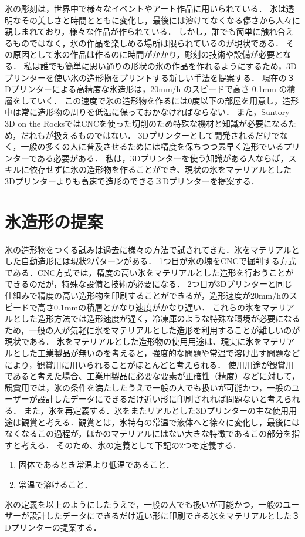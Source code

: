 氷の彫刻は，世界中で様々なイベントやアート作品に用いられている．
氷は透明なその美しさと時間とともに変化し，最後には溶けてなくなる儚さから人々に親しまれており，様々な作品が作られている．
しかし，誰でも簡単に触れ合えるものではなく，氷の作品を楽しめる場所は限られているのが現状である．
その原因として氷の作品は作るのに時間がかかり，彫刻の技術や設備が必要となる．
私は誰でも簡単に思い通りの形状の氷の作品を作れるようにするため，3Dプリンターを使い氷の造形物をプリントする新しい手法を提案する．
現在の３Dプリンターによる高精度な氷造形は，20mm/h のスピードで高さ 0.1mm の積層をしていく．
この速度で氷の造形物を作るには0度以下の部屋を用意し，造形中は常に造形物の周りを低温に保っておかなければならない．
また，Suntory-3D on the RocksではCNCを使った切削のため特殊な機材と知識が必要になるため，だれもが扱えるものではない．
3Dプリンターとして開発されるだけでなく，一般の多くの人に普及させるためには精度を保ちつつ素早く造形でいるプリンターである必要がある．
私は，3Dプリンターを使う知識がある人ならば，スキルに依存せずに氷の造形物を作ることができ、現状の氷をマテリアルとした3Dプリンターよりも高速で造形のできる３Dプリンターを提案する．

\section{氷造形の提案}
\label{sec:enum}

氷の造形物をつくる試みは過去に様々の方法で試されてきた．氷をマテリアルとした自動造形には現状2パターンがある．
1つ目が氷の塊をCNCで掘削する方式である．CNC方式では，精度の高い氷をマテリアルとした造形を行おうことができるのだが，特殊な設備と技術が必要になる．
2つ目が3Dプリンターと同じ仕組みで精度の高い造形物を印刷することができるが，造形速度が20mm/hのスピードで高さ0.1mmの積層とかなり速度がかなり遅い．
これらの氷をマテリアルとした造形方法では造形速度が遅く，冷凍庫のような特殊な環境が必要になるため，一般の人が気軽に氷をマテリアルとした造形を利用することが難しいのが現状である．
氷をマテリアルとした造形物の使用用途は、現実に氷をマテリアルとした工業製品が無いのを考えると，強度的な問題や常温で溶け出す問題などにより，観賞用に用いられることがほとんどと考えられる．
使用用途が観賞用であると考えた場合、工業用製品に必要な要素が正確性（精度）などに対して，観賞用では，氷の条件を満たしたうえで一般の人でも扱いが可能かつ，一般のユーザーが設計したデータにできるだけ近い形に印刷されれば問題ないと考えられる．
また，氷を再定義する．氷をまたリアルとした3Dプリンターの主な使用用途は観賞と考える．観賞とは，氷特有の常温で液体へと徐々に変化し，最後にはなくなるこの過程が，ほかのマテリアルにはない大きな特徴であるこの部分を指すと考える．
そのため、氷の定義として下記の2つを定義する．

\begin{enumerate}
  \item 固体であるとき常温より低温であること． 
  \item 常温で溶けること．
 \end{enumerate}

氷の定義を以上のようにしたうえで，一般の人でも扱いが可能かつ，一般のユーザーが設計したデータにできるだけ近い形に印刷できる氷をマテリアルとした３Dプリンターの提案する．




